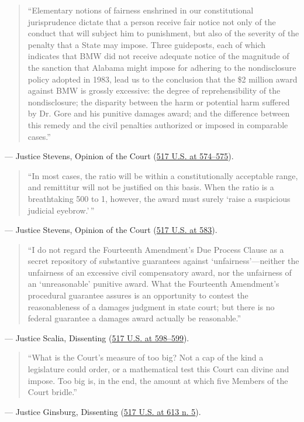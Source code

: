 \documentclass[12pt]{article}
\begin{document}
\begin{quote}
``Elementary notions of fairness enshrined in our constitutional jurisprudence dictate that a person receive fair notice not only of the conduct that will subject him to punishment, but also of the severity of the penalty that a State may impose. Three guideposts, each of which indicates that BMW did not receive adequate notice of the magnitude of the sanction that Alabama might impose for adhering to the nondisclosure policy adopted in 1983, lead us to the conclusion that the \$2 million award against BMW is grossly excessive: the degree of reprehensibility of the nondisclosure; the disparity between the harm or potential harm suffered by Dr. Gore and his punitive damages award; and the difference between this remedy and the civil penalties authorized or imposed in comparable cases.''
\end{quote}
\noindent --- Justice Stevens, Opinion of the Court (\href{https://supreme.justia.com/cases/federal/us/517/559/}{517 U.S. at 574--575}).

\begin{quote}
``In most cases, the ratio will be within a constitutionally acceptable range, and remittitur will not be justified on this basis. When the ratio is a breathtaking 500 to 1, however, the award must surely `raise a suspicious judicial eyebrow.'\,''
\end{quote}
\noindent --- Justice Stevens, Opinion of the Court (\href{https://supreme.justia.com/cases/federal/us/517/559/}{517 U.S. at 583}).

\begin{quote}
``I do not regard the Fourteenth Amendment's Due Process Clause as a secret repository of substantive guarantees against `unfairness'---neither the unfairness of an excessive civil compensatory award, nor the unfairness of an `unreasonable' punitive award. What the Fourteenth Amendment's procedural guarantee assures is an opportunity to contest the reasonableness of a damages judgment in state court; but there is no federal guarantee a damages award actually be reasonable.''
\end{quote}
\noindent --- Justice Scalia, Dissenting (\href{https://supreme.justia.com/cases/federal/us/517/559/}{517 U.S. at 598--599}).

\begin{quote}
``What is the Court's measure of too big? Not a cap of the kind a legislature could order, or a mathematical test this Court can divine and impose. Too big is, in the end, the amount at which five Members of the Court bridle.''
\end{quote}
\noindent --- Justice Ginsburg, Dissenting (\href{https://supreme.justia.com/cases/federal/us/517/559/}{517 U.S. at 613 n. 5}).
\end{document}
